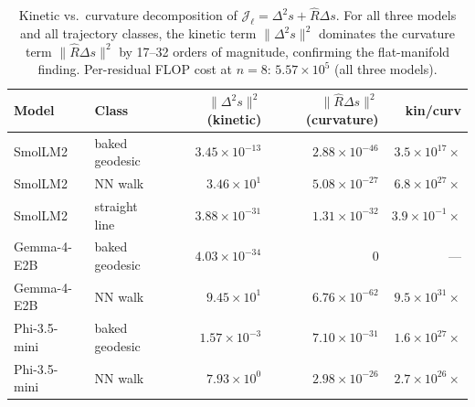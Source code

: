 \documentclass[11pt]{article}
\begin{document}
\begin{table}[h]\centering\small
\caption{Kinetic vs.\ curvature decomposition of
$\mathcal{J}_\ell = \Delta^2 s + \hat R \Delta s$.
For all three models and all trajectory classes, the kinetic term
$\|\Delta^2 s\|^2$ dominates the curvature term $\|\hat R \Delta s\|^2$
by 17--32 orders of magnitude, confirming the flat-manifold finding.
Per-residual FLOP cost at $n{=}8$: $5.57 \times 10^5$ (all three models).}
\label{tab:hjb-decomposition}
\begin{tabular}{@{}llrrr@{}}
\toprule
Model & Class & $\|\Delta^2 s\|^2$ (kinetic) & $\|\hat R \Delta s\|^2$ (curvature) & kin/curv \\
\midrule
SmolLM2 & baked geodesic & $3.45 \times 10^{-13}$ & $2.88 \times 10^{-46}$ & $3.5 \times 10^{17}\times$ \\
SmolLM2 & NN walk         & $3.46 \times 10^{1}$  & $5.08 \times 10^{-27}$ & $6.8 \times 10^{27}\times$ \\
SmolLM2 & straight line   & $3.88 \times 10^{-31}$ & $1.31 \times 10^{-32}$ & $3.9 \times 10^{-1}\times$ \\
Gemma-4-E2B & baked geodesic & $4.03 \times 10^{-34}$ & $0$ & --- \\
Gemma-4-E2B & NN walk         & $9.45 \times 10^{1}$  & $6.76 \times 10^{-62}$ & $9.5 \times 10^{31}\times$ \\
Phi-3.5-mini & baked geodesic & $1.57 \times 10^{-3}$  & $7.10 \times 10^{-31}$ & $1.6 \times 10^{27}\times$ \\
Phi-3.5-mini & NN walk         & $7.93 \times 10^{0}$  & $2.98 \times 10^{-26}$ & $2.7 \times 10^{26}\times$ \\
\bottomrule
\end{tabular}
\end{table}

\clearpage
\printbibliography
\end{document}
